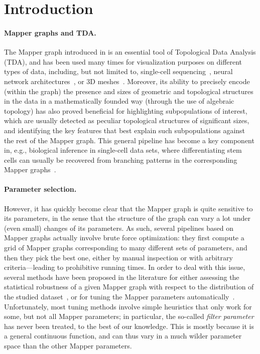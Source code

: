 \section{Introduction}




\paragraph*{Mapper graphs and TDA.} The Mapper graph introduced in \cite{singh2007topological} is an essential tool of Topological Data Analysis (TDA), and has been used many times for visualization purposes
on different types of data, including, but not limited to, single-cell sequencing~\cite{wang2018topological,zechel2014topographical}, neural network architectures~\cite{9605336,joseph2021topological}, or 3D meshes~\cite{wang2020exploration,rosen2018inferring}.
Moreover, its ability to precisely encode (within the graph) the presence and sizes of geometric and topological structures in the data in a mathematically founded way
(through the use of algebraic topology) has also proved beneficial for highlighting subpopulations of interest, which are usually detected as peculiar
topological structures of significant sizes, and identifying the key features that best explain such subpopulations against the rest of the Mapper graph.
This general pipeline has become a key component in, e.g., biological inference in single-cell data sets, where differentiating stem cells can usually
be recovered from branching patterns in the corresponding Mapper graphs~\cite{Rizvi2017}.

\paragraph*{Parameter selection.} However, it has quickly become clear that the Mapper graph is quite sensitive to its parameters, in the
sense that the structure of the graph can vary a lot under (even small) changes of its parameters. As such, several pipelines based on Mapper
graphs actually involve brute force optimization: they first compute a grid of Mapper graphs corresponding to many different sets of parameters,
and then they pick the best one, either by manual inspection or with arbitrary criteria---leading to prohibitive running times.
In order to deal with this issue, several methods have been proposed in the literature for either assessing the statistical robustness of a given Mapper graph with respect to the distribution of the studied dataset~\cite{belchi2020numerical, Brown2021}, or for tuning the Mapper parameters automatically~\cite{carriere2018statistical}. 
Unfortunately, most tuning methods
involve simple heuristics that only work for some, but not all Mapper parameters; in particular, the so-called {\em filter parameter} has never been treated, to the best of our knowledge. This is mostly because it is a general continuous function, and can thus vary in a much wilder parameter space than the other Mapper parameters.

